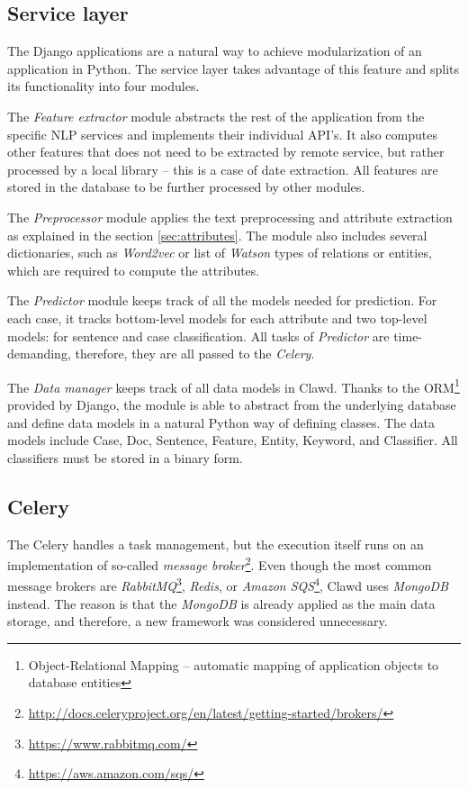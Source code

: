 \documentclass[
  digital, %
  notable,   %
  nolof,     %
  nolot,     %
]{fithesis3}
\begin{document}
\subsection{Service layer}
The Django applications are a natural way to achieve modularization of an application in Python.
The service layer takes advantage of this feature and splits its functionality into four modules.

The \textit{Feature extractor} module abstracts the rest of the application from the specific NLP services and implements their individual API's.
It also computes other features that does not need to be extracted by remote service, but rather processed by a local library -- this is a case of date extraction.
All features are stored in the database to be further processed by other modules.

The \textit{Preprocessor} module applies the text preprocessing and attribute extraction as explained in the section \ref{sec:attributes}.
The module also includes several dictionaries, such as \textit{Word2vec} or list of \textit{Watson} types of relations or entities, which are required to compute the attributes.

The \textit{Predictor} module keeps track of all the models needed for prediction.
For each case, it tracks bottom-level models for each attribute and two top-level models: for sentence and case classification.
All tasks of \textit{Predictor} are time-demanding, therefore, they are all passed to the \textit{Celery}.

The \textit{Data manager} keeps track of all data models in Clawd.
Thanks to the ORM\footnote{Object-Relational Mapping -- automatic mapping of application objects to database entities} provided by Django, the module is able to abstract from the underlying database and define data models in a natural Python way of defining classes.
The data models include Case, Doc, Sentence, Feature, Entity, Keyword, and Classifier.
All classifiers must be stored in a binary form.

\subsection{Celery}
The Celery handles a task management, but the execution itself runs on an implementation of so-called \textit{message broker}\footnote{\url{http://docs.celeryproject.org/en/latest/getting-started/brokers/}}.
Even though the most common message brokers are \textit{RabbitMQ}\footnote{\url{https://www.rabbitmq.com/}}, \textit{Redis}, or \textit{Amazon SQS}\footnote{\url{https://aws.amazon.com/sqs/}}, Clawd uses \textit{MongoDB} instead.
The reason is that the \textit{MongoDB} is already applied as the main data storage, and therefore, a new framework was considered unnecessary.
\end{document}
